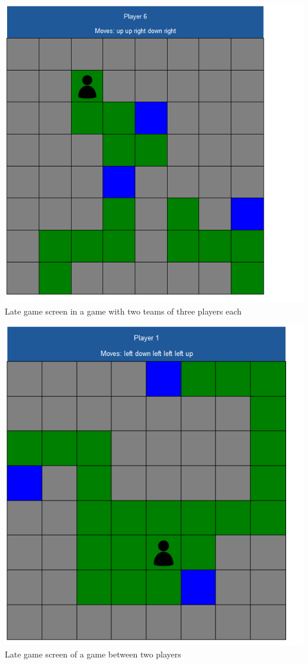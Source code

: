 \documentclass[a4paper,12pt]{extarticle}
\begin{document}
\begin{center}
\includegraphics[scale=0.5]{Team1.png}\\
Late game screen in a game with two teams of three players each
\end{center}

\begin{center}
\includegraphics[scale=0.5]{Team2.png}\\
Late game screen of a game between two players
\end{center}
\end{document}
